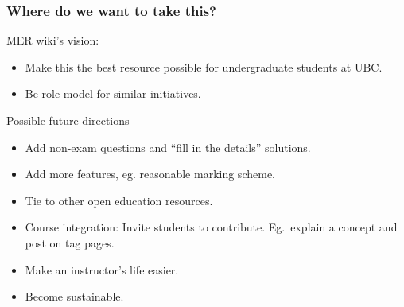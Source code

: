 \documentclass{beamer}
\begin{document}
\frame
{
  \frametitle{Where do we want to take this?}

\alert{MER wiki's vision:}
\begin{itemize}
\item Make this the best resource possible for undergraduate students at UBC.

\item Be role model for similar initiatives.
\end{itemize}

\begin{block}{Possible future directions}
      \begin{itemize}
            \item Add non-exam questions and ``fill in the details'' solutions. %
            \item Add more features, eg. reasonable marking scheme.
            \item Tie to other open education resources.
            \item Course integration: Invite students to contribute. Eg.\ explain a concept and post on tag pages.
            \item Make an instructor's life easier.
            \item \alert{Become sustainable.}
        \end{itemize}
\end{block}

}



\end{document}
